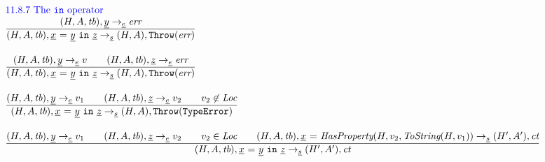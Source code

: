 \documentclass[a4paper, leqno]{amsart}
\newcommand{\rulesep}{\quad\quad}
\newcommand{\stmt}{s}
\newcommand{\expr}{e}
\newcommand{\ir}[1]{\ensuremath{\underline{#1}}}
\newcommand{\irid}{\ir{x}}
\def\inblue{\color{blue}}
\newcommand{\tb}{\emph{tb}}
\newcommand{\err}{\emph{err}}
\newcommand{\te}{{\tt TypeError}}
\newcommand{\Loc}{\emph{Loc}}
\newcommand{\ct}{\emph{ct}}
\newcommand{\hf}[1]{\emph{#1}}
\newcommand{\error}{\ensuremath{{\tt Throw}(\err)}}
\newcommand{\thte}{\ensuremath{{\tt Throw}(\te)}}
\newcommand{\state}{\ensuremath{(H,A,\tb)}}
\newcommand{\res}{\ensuremath{(H,A)}}
\newcommand{\resp}{\ensuremath{(H',A')}}
\newcommand{\evale}{\ensuremath{(H,A,\tb)}}
\def\inblue{\color{blue}}
\begin{document}
\[
\begin{array}{l@{~~}l@{~~}ll}
\mbox{\inblue 11.8.7 The {\tt in} operator}\\

\frac{\begin{matrix}
\evale, \ir{y} \rightarrow_{\ir\expr} \err
\end{matrix}}{\begin{matrix}
\state, \irid \ {\tt =} \ \ir{y} \ {\tt in}\ \ir{z}
\rightarrow_{\ir\stmt}
\res, \error
\end{matrix}}
\\[2em]

\frac{\begin{matrix}
\evale, \ir{y} \rightarrow_{\ir\expr} v
\rulesep
\evale, \ir{z} \rightarrow_{\ir\expr} \err
\end{matrix}}{\begin{matrix}
\state, \irid \ {\tt =} \ \ir{y} \ {\tt in}\ \ir{z}
\rightarrow_{\ir\stmt}
\res, \error
\end{matrix}}
\\[2em]

\frac{\begin{matrix}
\evale, \ir{y} \rightarrow_{\ir\expr} v_1
\rulesep
\evale, \ir{z} \rightarrow_{\ir\expr} v_2
\rulesep
v_2 \not\in \Loc
\end{matrix}}{\begin{matrix}
\state, \irid \ {\tt =} \ \ir{y} \ {\tt in}\ \ir{z}
\rightarrow_{\ir\stmt}
\res, \thte
\end{matrix}}
\\[2em]

\frac{\begin{matrix}
\evale, \ir{y} \rightarrow_{\ir\expr} v_1
\rulesep
\evale, \ir{z} \rightarrow_{\ir\expr} v_2
\rulesep
v_2 \in \Loc
\rulesep
\state, \irid \ {\tt =} \ \hf{HasProperty}(H,v_2,\hf{ToString}(H,v_1)) \rightarrow_{\ir\stmt} \resp,\ct
\end{matrix}}{\begin{matrix}
\state, \irid \ {\tt =} \ \ir{y} \ {\tt in}\ \ir{z}
\rightarrow_{\ir\stmt}
\resp,\ct
\end{matrix}}
\\[2em]
\end{array}
\]

\end{document}
